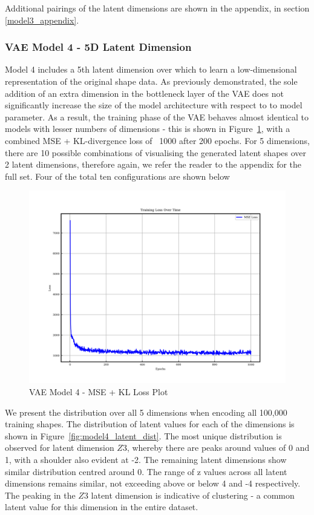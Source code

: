 \documentclass{article}
\begin{document}
Additional pairings of the latent dimensions are shown in the appendix, in section \ref{model3_appendix}.

\subsubsection{VAE Model 4 - 5D Latent Dimension}

Model 4 includes a 5th latent dimension over which to learn a low-dimensional representation of the original shape data. As previously demonstrated, the sole addition of an extra dimension in the bottleneck layer of the VAE does not significantly increase the size of the model architecture with respect to to model parameter. As a result, the training phase of the VAE behaves almost identical to models with lesser numbers of dimensions - this is shown in Figure~\ref{fig:model4_loss_plot}, with a combined MSE + KL-divergence loss of ~1000 after 200 epochs. For 5 dimensions, there are 10 possible combinations of visualising the generated latent shapes over 2 latent dimensions, therefore again, we refer the reader to the appendix for the full set. Four of the total ten configurations are shown below

\begin{figure}[H]
\centering
    \includegraphics[width=0.75\linewidth]{figures/VAEmodels/model4/loss_plot.png}
    \caption{VAE Model 4 - MSE + KL Loss Plot}
    \label{fig:model4_loss_plot}
\end{figure}

We present the distribution over all 5 dimensions when encoding all 100,000 training shapes. The distribution of latent values for each of the dimensions is shown in Figure~\ref{fig:model4_latent_dist}. The most unique distribution is observed for latent dimension $Z3$, whereby there are peaks around values of 0 and 1, with a shoulder also evident at -2. The remaining latent dimensions show similar distribution centred around 0. The range of z values across all latent dimensions remains similar, not exceeding above or below 4 and -4 respectively. The peaking in the $Z3$ latent dimension is indicative of clustering - a common latent value for this dimension in the entire dataset.
\end{document}
